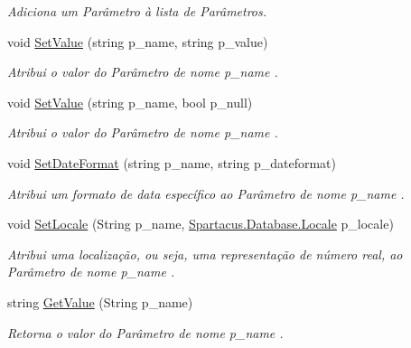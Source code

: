 \begin{DoxyCompactItemize}
\begin{DoxyCompactList}\small\item\em Adiciona um Parâmetro à lista de Parâmetros. \end{DoxyCompactList}\item 
void \hyperlink{classSpartacus_1_1Database_1_1Command_a905b936fa9ea2528e2b0aeb0cf9364b8}{Set\+Value} (string p\+\_\+name, string p\+\_\+value)
\begin{DoxyCompactList}\small\item\em Atribui o valor do Parâmetro de nome {\itshape p\+\_\+name} . \end{DoxyCompactList}\item 
void \hyperlink{classSpartacus_1_1Database_1_1Command_a2e63315ecde0374b3c09e8a70d69a2d9}{Set\+Value} (string p\+\_\+name, bool p\+\_\+null)
\begin{DoxyCompactList}\small\item\em Atribui o valor do Parâmetro de nome {\itshape p\+\_\+name} . \end{DoxyCompactList}\item 
void \hyperlink{classSpartacus_1_1Database_1_1Command_a8903011c730c4d62b58d2c262e21e97c}{Set\+Date\+Format} (string p\+\_\+name, string p\+\_\+dateformat)
\begin{DoxyCompactList}\small\item\em Atribui um formato de data específico ao Parâmetro de nome {\itshape p\+\_\+name} . \end{DoxyCompactList}\item 
void \hyperlink{classSpartacus_1_1Database_1_1Command_a9890ac8a0731a0344be06bd51a4eb76e}{Set\+Locale} (String p\+\_\+name, \hyperlink{namespaceSpartacus_1_1Database_a5c77dce887cad55e7ea67f0f98a7d71f}{Spartacus.\+Database.\+Locale} p\+\_\+locale)
\begin{DoxyCompactList}\small\item\em Atribui uma localização, ou seja, uma representação de número real, ao Parâmetro de nome {\itshape p\+\_\+name} . \end{DoxyCompactList}\item 
string \hyperlink{classSpartacus_1_1Database_1_1Command_a568d7745d17518efa25c066c4ad96b6e}{Get\+Value} (String p\+\_\+name)
\begin{DoxyCompactList}\small\item\em Retorna o valor do Parâmetro de nome {\itshape p\+\_\+name} . \end{DoxyCompactList}\end{DoxyCompactItemize}
